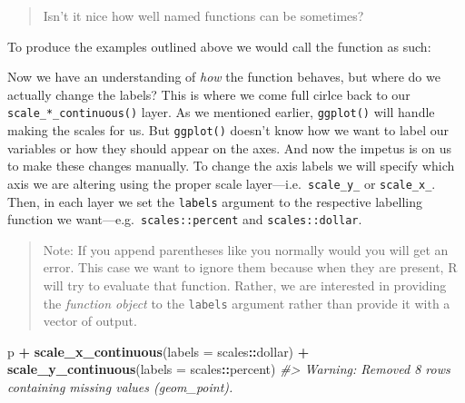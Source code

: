 \documentclass[
]{book}
\newenvironment{Shaded}{\begin{snugshade}}{\end{snugshade}}
\newcommand{\CommentTok}[1]{\textcolor[rgb]{0.56,0.35,0.01}{\textit{#1}}}
\newcommand{\DataTypeTok}[1]{\textcolor[rgb]{0.13,0.29,0.53}{#1}}
\newcommand{\DecValTok}[1]{\textcolor[rgb]{0.00,0.00,0.81}{#1}}
\newcommand{\KeywordTok}[1]{\textcolor[rgb]{0.13,0.29,0.53}{\textbf{#1}}}
\newcommand{\NormalTok}[1]{#1}
\newcommand{\OperatorTok}[1]{\textcolor[rgb]{0.81,0.36,0.00}{\textbf{#1}}}
\newcommand{\StringTok}[1]{\textcolor[rgb]{0.31,0.60,0.02}{#1}}
\begin{document}
\begin{quote}
Isn't it nice how well named functions can be sometimes?
\end{quote}

To produce the examples outlined above we would call the function as such:

\begin{Shaded}
\end{Shaded}

Now we have an understanding of \emph{how} the function behaves, but where do we actually change the labels? This is where we come full cirlce back to our \texttt{scale\_*\_continuous()} layer. As we mentioned earlier, \texttt{ggplot()} will handle making the scales for us. But \texttt{ggplot()} doesn't know how we want to label our variables or how they should appear on the axes. And now the impetus is on us to make these changes manually. To change the axis labels we will specify which axis we are altering using the proper scale layer---i.e.~\texttt{scale\_y\_} or \texttt{scale\_x\_}. Then, in each layer we set the \texttt{labels} argument to the respective labelling function we want---e.g.~\texttt{scales::percent} and \texttt{scales::dollar}.

\begin{quote}
Note: If you append parentheses like you normally would you will get an error. This case we want to ignore them because when they are present, R will try to evaluate that function. Rather, we are interested in providing the \emph{function object} to the \texttt{labels} argument rather than provide it with a vector of output.
\end{quote}

\begin{Shaded}
\begin{Highlighting}[]
\NormalTok{p }\OperatorTok{+}\StringTok{ }
\StringTok{  }\KeywordTok{scale\_x\_continuous}\NormalTok{(}\DataTypeTok{labels =}\NormalTok{ scales}\OperatorTok{::}\NormalTok{dollar) }\OperatorTok{+}\StringTok{ }
\StringTok{  }\KeywordTok{scale\_y\_continuous}\NormalTok{(}\DataTypeTok{labels =}\NormalTok{ scales}\OperatorTok{::}\NormalTok{percent)}
\CommentTok{\#\textgreater{} Warning: Removed 8 rows containing missing values (geom\_point).}
\end{Highlighting}
\end{Shaded}
\end{document}
